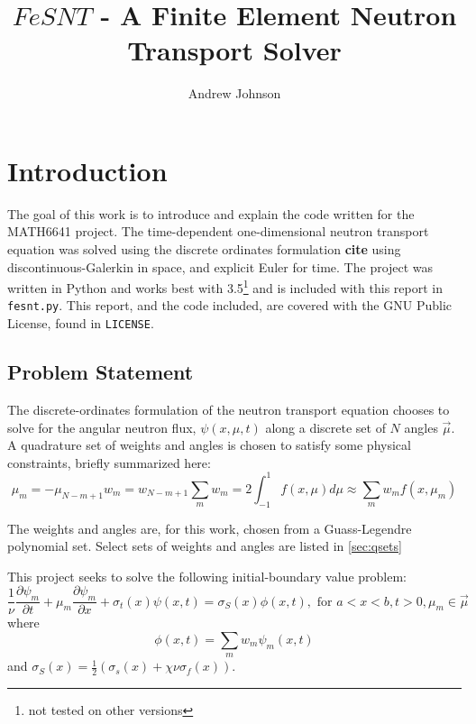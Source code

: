 \documentclass{article}
\title{$FeSNT$ - A Finite Element Neutron Transport Solver}
\author{Andrew Johnson}
\newcommand{\pdiff}[2]{\frac{\partial#1}{\partial#2}}
\newcommand{\ddx}[1]{\pdiff{#1}{x}}
\newcommand{\ddt}[1]{\pdiff{#1}{t}}
\newcommand{\dpmdx}{\ddx{\psi_m}}
\newcommand{\dpmdt}{\ddt{\psi_m}}
\newcommand{\fisTrms}{\chi\nu\sigma_f}
\newcommand{\tfor}{\text{ for }}
\begin{document}
\maketitle

\section{Introduction}
The goal of this work is to introduce and explain the code written for the MATH6641 project.
The time-dependent one-dimensional neutron transport equation was solved using the discrete 
ordinates formulation \textbf{cite} using discontinuous-Galerkin in space, and
explicit Euler for time.
The project was written in Python and works best with 3.5\footnote{not tested on other versions}
and is included with this report in \texttt{fesnt.py}.
This report, and the code included, are covered with the GNU Public License, found in \texttt{LICENSE}.

\subsection{Problem Statement}
The discrete-ordinates formulation of the neutron transport equation chooses to solve for the angular
neutron flux, $\psi(x, \mu, t)$ along a discrete set of $N$ angles $\vec{\mu}$. A quadrature set of 
weights and angles is chosen to satisfy some physical constraints, briefly summarized here:
\begin{subequations} 
    \label{eq:quadRules}
    \begin{equation}
        \mu_m = -\mu_{N-m+1}
    \end{equation}
    \begin{equation}
        w_m = w_{N-m+1}
    \end{equation}
    \begin{equation}
        \sum_m w_m = 2
    \end{equation}
    \begin{equation}
        \int_{-1}^1f(x, \mu)d\mu\approx\sum_mw_m f(x, \mu_m)
    \end{equation}
\end{subequations}

The weights and angles are, for this work, chosen from a Guass-Legendre polynomial set.
Select sets of weights and angles are listed in \cref{sec:qsets}

This project seeks to solve the following initial-boundary value problem:
\begin{equation} \label{eq:ibvpNTE}
    \frac{1}{\nu}\dpmdt+\mu_m\dpmdx+\sigma_t(x)\psi(x, t) = 
    \sigma_S(x)\phi(x, t), \tfor a<x<b,t>0, \mu_m\in\vec{\mu}
\end{equation}
where
\begin{equation}
    \phi(x, t) = \sum_mw_m\psi_m(x, t)
\end{equation}
and $\sigma_S(x) =\frac{1}{2}\left(\sigma_s(x) + \fisTrms(x)\right)$.
\end{document}
